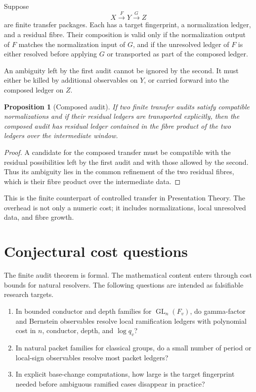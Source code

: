 \documentclass[11pt]{article}
\newtheorem{proposition}[theorem]{Proposition}
\begin{document}
Suppose
\[
X\xrightarrow{F}Y\xrightarrow{G}Z
\]
are finite transfer packages.  Each has a target fingerprint, a normalization ledger, and a residual fibre.  Their composition is valid only if the normalization output of \(F\) matches the normalization input of \(G\), and if the unresolved ledger of \(F\) is either resolved before applying \(G\) or transported as part of the composed ledger.

An ambiguity left by the first audit cannot be ignored by the second.  It must either be killed by additional observables on \(Y\), or carried forward into the composed ledger on \(Z\).

\begin{proposition}[Composed audit]
If two finite transfer audits satisfy compatible normalizations and if their residual ledgers are transported explicitly, then the composed audit has residual ledger contained in the fibre product of the two ledgers over the intermediate window.
\end{proposition}

\begin{proof}
A candidate for the composed transfer must be compatible with the residual possibilities left by the first audit and with those allowed by the second.  Thus its ambiguity lies in the common refinement of the two residual fibres, which is their fibre product over the intermediate data.
\end{proof}

This is the finite counterpart of controlled transfer in Presentation Theory.  The overhead is not only a numeric cost; it includes normalizations, local unresolved data, and fibre growth.

\section{Conjectural cost questions}

The finite audit theorem is formal.  The mathematical content enters through cost bounds for natural resolvers.  The following questions are intended as falsifiable research targets.

\begin{enumerate}[label=\textup{(\roman*)}]
\item In bounded conductor and depth families for \(\operatorname{GL}_n(F_v)\), do gamma-factor and Bernstein observables resolve local ramification ledgers with polynomial cost in \(n\), conductor, depth, and \(\log q_v\)?
\item In natural packet families for classical groups, do a small number of period or local-sign observables resolve most packet ledgers?
\item In explicit base-change computations, how large is the target fingerprint needed before ambiguous ramified cases disappear in practice?
\end{enumerate}
\end{document}
